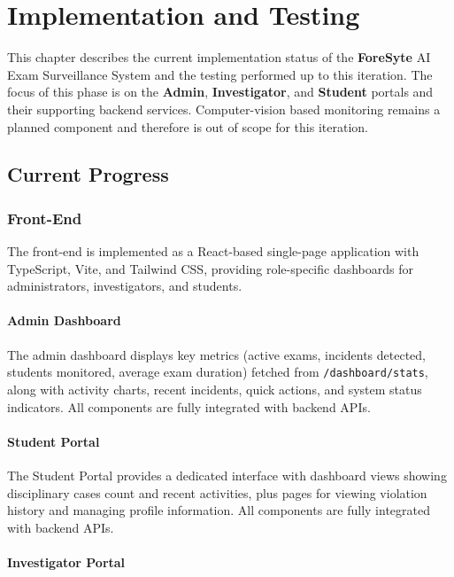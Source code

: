 \chapter{Implementation and Testing}

This chapter describes the current implementation status of the \textbf{ForeSyte} AI Exam Surveillance System and the testing performed up to this iteration. The focus of this phase is on the \textbf{Admin}, \textbf{Investigator}, and \textbf{Student} portals and their supporting backend services. Computer-vision based monitoring remains a planned component and therefore is out of scope for this iteration.

\section{Current Progress}

\subsection{Front-End}

The front-end is implemented as a React-based single-page application with TypeScript, Vite, and Tailwind CSS, providing role-specific dashboards for administrators, investigators, and students.

\subsubsection*{Admin Dashboard}

The admin dashboard displays key metrics (active exams, incidents detected, students monitored, average exam duration) fetched from \texttt{/dashboard/stats}, along with activity charts, recent incidents, quick actions, and system status indicators. All components are fully integrated with backend APIs.

\subsubsection*{Student Portal}

The Student Portal provides a dedicated interface with dashboard views showing disciplinary cases count and recent activities, plus pages for viewing violation history and  managing profile information. All components are fully integrated with backend APIs.

\subsubsection*{Investigator Portal}

